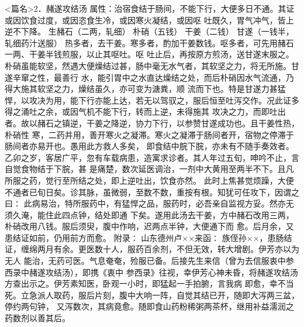 \documentclass[a4paper,12pt,UTF8,twoside]{ctexbook}
\begin{document}
<篇名>2．赭遂攻结汤
属性：治宿食结于肠间，不能下行，大便多日不通。其证或因饮食过度，或因恣食生冷，或因寒火凝结，或因呕 
吐既久，胃气冲气，皆上逆不下降。 
生赭石（二两，轧细） 朴硝（五钱） 干姜（二钱） 甘遂（一钱半，轧细药汁送服） 
热多者，去干姜。寒多者，酌加干姜数钱。呕多者，可先用赭石一两、干姜半钱煎服，以止其呕吐。呕 
吐止后，再按原方煎汤，送甘遂末服之。 
朴硝虽能软坚，然遇大便燥结过甚，肠中毫无水气者，其软坚之力，将无所施。甘遂辛窜之性，最善行 
水，能引胃中之水直达燥结之处，而后朴硝因水气流通，乃得大施其软坚之力，燥结虽久，亦可变为溏粪，顺 
流而下也。特是甘遂力甚猛悍，以攻决为用，能下行亦能上达，若无以驾驭之，服后恒至吐泻交作。况此证多 
得之涌吐之余，或因气机不能下行，转而上逆，未得施其 
攻决之力，而即吐出者。故以赭石之镇逆，干姜之降逆，协力下行，以参赞甘遂成功也。且干姜性热，朴硝性 
寒，二药并用，善开寒火之凝滞。寒火之凝滞于肠间者开，宿物之停滞于肠间者亦易开也。愚用此方救人多矣， 
即食结中脘下脘，亦未有不随手奏效者。 
乙卯之岁，客居广平，忽有车载病患，造寓求诊者。其人年过五旬，呻吟不止，言自觉食物结于下脘，甚 
是痛楚，数次延医调治，一剂中大黄用至两半不下。且凡所服之药，觉行至所结之处，即上逆吐出，饮食亦然。 
此时上焦甚觉烦躁，大便不通者已旬日矣。诊其脉，虽微弱，至数不数，重按有根。知犹可任攻下，因谓之曰∶ 
此病易治，特所服药中，有猛悍之品，服药时，必吾亲自监视方妥。然亦无须久淹，能住此四点钟，结处即通 
下矣。遂用此汤去干姜，方中赭石改用三两，朴硝改用八钱。服后须臾，腹中作响，迟两点半钟，大便通下而 
愈。后月余，又患结证如前，仍用前方而愈。 
附录∶ 
山东德州卢××来函∶ 
族侄孙××，患肠结证，缠绵两月有余。更医数十人，服药百余剂，不但无效，转大增剧。伊芳亦以为无人 
能治，无药可医。气息奄奄，殓服已备。后接先生来信（曾为去信服衷中参西录中赭遂攻结汤），即携《衷中 
参西录》往视，幸伊芳心神未昏，将赭遂攻结汤方查出示之。伊芳素知医，卧观一小时，即猛起一手拍腑，言我病 
即愈，幸不当死。立急派人取药，服后片刻，腹中大响一阵，自觉其结已开，随即大泻两三盆，停约两句钟， 
又泻数次，其病竟愈。随即食山药粉稀粥两茶杯，继用补益濡润之药数剂以善其后。 
\end{document}

